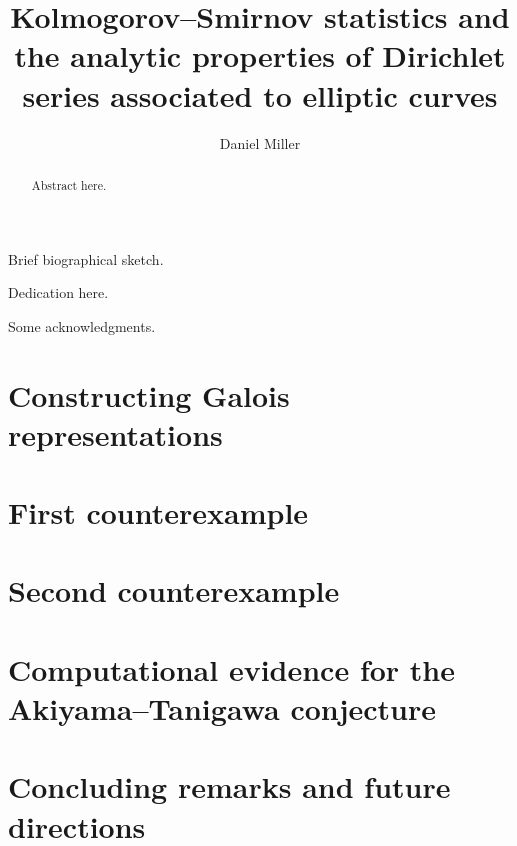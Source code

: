 \documentclass[phd,cornellheadings,draft]{cornell}
\title{Kolmogorov--Smirnov statistics and the analytic properties of Dirichlet series associated to elliptic curves}
\author{Daniel Miller}
\begin{document}
\maketitle
\makecopyright

\begin{abstract}
Abstract here. 
\end{abstract}

\begin{biosketch}
Brief biographical sketch.
\end{biosketch}

\begin{dedication}
Dedication here.
\end{dedication}

\begin{acknowledgements}
Some acknowledgments.
\end{acknowledgements}

\contentspage

\normalspacing
\setcounter{page}{1}
\pagestyle{cornell}










\chapter{Constructing Galois representations}
\chapter{First counterexample}
\chapter{Second counterexample}
\chapter{Computational evidence for the Akiyama--Tanigawa conjecture}
\chapter{Concluding remarks and future directions}





\printbibliography
\end{document}
